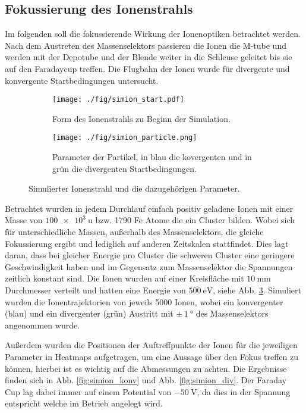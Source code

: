 \subsection{Fokussierung des Ionenstrahls}
\label{sec:fokus1}
Im folgenden soll die fokussierende Wirkung der Ionenoptiken betrachtet werden.
Nach dem Austreten des Massenselektors passieren die Ionen die M-tube und werden mit der Depotube und der Blende weiter in die Schleuse geleitet bis sie auf den Faradaycup treffen.
Die Flugbahn der Ionen wurde für divergente und konvergente Startbedingungen untersucht.
\begin{figure}
  \centering
  \begin{subfigure}[h]{0.5\textwidth}
    \texttt{[image: ./fig/simion\_start.pdf]}
    \caption{Form des Ionenstrahls zu Beginn der Simulation.}
    \label{fig:strahlform}
  \end{subfigure}\hfill
  \begin{subfigure}[h]{0.475\textwidth}
    \texttt{[image: ./fig/simion\_particle.png]}
    \caption{Parameter der Partikel, in blau die kovergenten und in grün die divergenten Startbedingungen.}
    \label{fig:strahlparameter}
  \end{subfigure}
  \caption{Simulierter Ionenstrahl und die dazugehörigen Parameter.}
  \label{fig:simion_start}
\end{figure}
Betrachtet wurden in jedem Durchlauf einfach positiv geladene Ionen mit einer Masse von $\SI{100e3}{\amu}$ bzw. 1790 Fe Atome die ein Cluster bilden.
Wobei sich für unterschiedliche Massen, außerhalb des Massenselektors, die gleiche Fokussierung ergibt
und lediglich auf anderen Zeitskalen stattfindet.
Dies lagt daran, dass bei gleicher Energie pro Cluster die schweren Cluster eine geringere Geschwindigkeit haben und im Gegensatz zum Massenselektor die Spannungen zeitlich konstant sind.
Die Ionen wurden auf einer Kreisfläche mit $\SI{10}{\mm}$ Durchmesser verteilt und hatten eine Energie von $\SI{500}{\eV}$, siehe Abb. \ref{fig:simion_start}.
Simuliert wurden die Ionentrajektorien von jeweils 5000 Ionen, wobei ein konvergenter (blau) und ein divergenter (grün) Austritt mit $\pm\,\SI{1}{\degree}$ des Massenselektors angenommen wurde.




Außerdem wurden die Positionen der Auftreffpunkte der Ionen für die jeweiligen Parameter in Heatmaps aufgetragen, um eine Aussage über den Fokus treffen zu können, hierbei ist es wichtig auf die Abmessungen zu achten.
Die Ergebnisse finden sich in Abb. \ref{fig:simion_konv} und Abb. \ref{fig:simion_div}.
Der Faraday Cup lag dabei immer auf einem Potential von $\SI{-50}{\volt}$, da dies in der Spannung entspricht welche im Betrieb angelegt wird.\\


